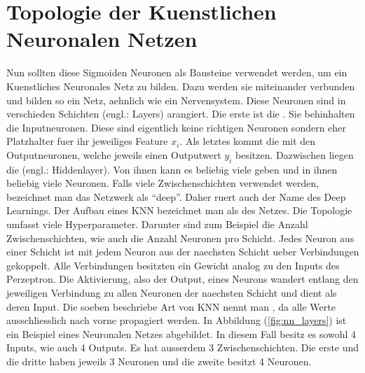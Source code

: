 \section{Topologie der Kuenstlichen Neuronalen Netzen}
Nun sollten diese Sigmoiden Neuronen als Bausteine verwendet werden, um ein Kuenstliches
Neuronales Netz zu bilden. Dazu werden sie miteinander verbunden und bilden so ein Netz,
aehnlich wie ein Nervensystem.
\para{}
Diese Neuronen sind in verschieden Schichten (engl.: Layers)
arangiert. Die erste ist die . Sie behinhalten die
Inputneuronen. Diese sind eigentlich keine richtigen
Neuronen sondern eher Platzhalter fuer ihr jeweiliges Feature $x_i$. Als letztes kommt die
 mit den Outputneuronen, welche jeweils einen Outputwert $y_i$
besitzen. Dazwischen liegen die  (engl.: Hiddenlayer). Von ihnen kann es
beliebig viele geben und in ihnen beliebig viele Neuronen.
Falls viele Zwischenschichten verwendet werden, bezeichnet man das Netzwerk als
``deep''. Daher ruert auch der Name des Deep Learnings.
Der Aufbau eines KNN bezeichnet man als  des Netzes. Die
Topologie umfasst viele Hyperparameter. Darunter sind zum Beispiel die Anzahl Zwischenschichten, wie auch
die Anzahl Neuronen pro Schicht.
\para{}
Jedes Neuron aus einer Schicht ist mit jedem Neuron aus der naechsten Schicht ueber
Verbindungen gekoppelt. Alle Verbindungen besitzten ein Gewicht analog zu den Inputs des
Perzeptron. Die Aktivierung, also der Output, eines Neurons wandert entlang den jeweiligen
Verbindung zu allen Neuronen der naechsten Schicht und dient als deren Input.
Die soeben beschriebe Art von KNN nennt man , da alle Werte
ausschliesslich nach vorne propagiert werden.
\para{}
In Abbildung (\ref{fig:nn_layers}) ist ein Beispiel eines Neuronalen Netzes
abgebildet. In diesem Fall besitz es sowohl 4 Inputs, wie auch 4 Outputs. Es hat
ausserdem 3 Zwischenschichten. Die erste und die dritte haben jeweils 3 Neuronen
und die zweite besitzt 4 Neuronen. \\


